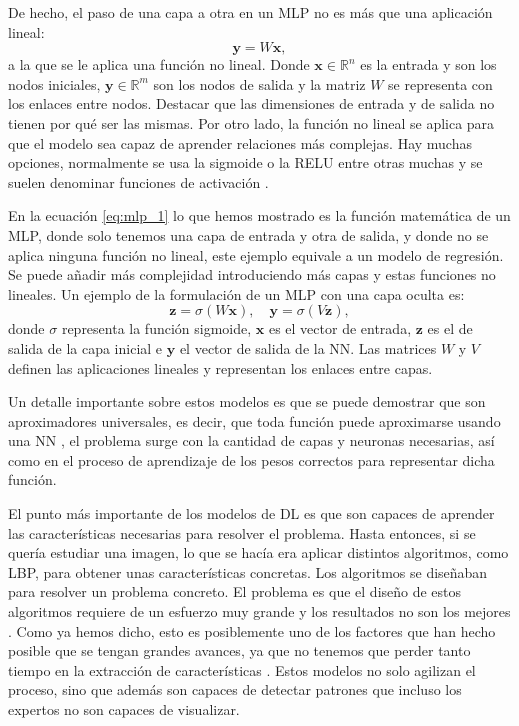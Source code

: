 \documentclass[a4paper,12pt,oneside,titlepage]{book}
\begin{document}
De hecho, el paso de una capa a otra en un MLP no es más que una aplicación lineal:
\begin{equation}
  \label{eq:mlp_1}
  \mathbf{y} = W\mathbf{x},
\end{equation}
a la que se le aplica una función no lineal. Donde $\mathbf{x} \in \mathbb{R}^n $ es la entrada y son los nodos iniciales, $\mathbf{y} \in \mathbb{R}^m$ son los nodos de salida y la matriz $W$ se representa con los enlaces entre nodos. Destacar que las dimensiones de entrada y de salida no tienen por qué ser las mismas. Por otro lado, la función no lineal se aplica para que el modelo sea capaz de aprender relaciones más complejas. Hay muchas opciones, normalmente se usa la sigmoide o la RELU entre otras muchas y se suelen denominar funciones de activación \cite{dl_book}.

En la ecuación \ref{eq:mlp_1} lo que hemos mostrado es la función matemática de un MLP, donde solo tenemos una capa de entrada y otra de salida, y donde no se aplica ninguna función no lineal, este ejemplo equivale a un modelo de regresión. Se puede añadir más complejidad introduciendo más capas y estas funciones no lineales. Un ejemplo de la formulación de un MLP con una capa oculta es:
\begin{equation}
  \mathbf{z} = \sigma(W\mathbf{x}), \quad \mathbf{y} = \sigma(V\mathbf{z}),
\end{equation}
donde $\sigma$ representa la función sigmoide, $\mathbf{x}$ es el vector de entrada, $\mathbf{z}$ es el de salida de la capa inicial e $\mathbf{y}$ el vector de salida de la NN. Las matrices $W$ y $V$ definen las aplicaciones lineales y representan los enlaces entre capas.

Un detalle importante sobre estos modelos es que se puede demostrar que son aproximadores universales, es decir, que toda función puede aproximarse usando una NN \cite{aprox_1,aprox_2}, el problema surge con la cantidad de capas y neuronas necesarias, así como en el proceso de aprendizaje de los pesos correctos para representar dicha función.

El punto más importante de los modelos de DL es que son capaces de aprender las características necesarias para resolver el problema. Hasta entonces, si se quería estudiar una imagen, lo que se hacía era aplicar distintos algoritmos, como LBP, para obtener unas características concretas. Los algoritmos se diseñaban para resolver un problema concreto. El problema es que el diseño de estos algoritmos requiere de un esfuerzo muy grande y los resultados no son los mejores \cite{dl_nature}. Como ya hemos dicho, esto es posiblemente uno de los factores que han hecho posible que se tengan grandes avances, ya que no tenemos que perder tanto tiempo en la extracción de características \cite{dl_nature}. Estos modelos no solo agilizan el proceso, sino que además son capaces de detectar patrones que incluso los expertos no son capaces de visualizar.
\end{document}
